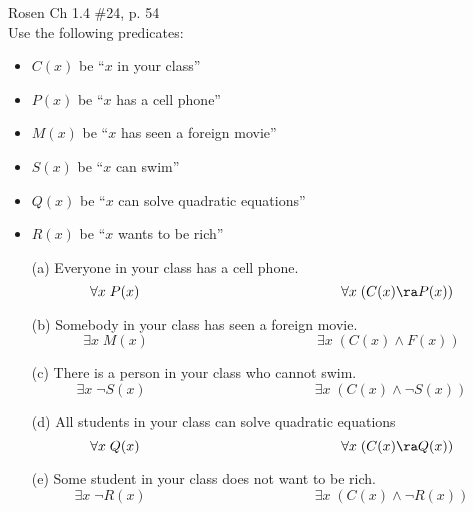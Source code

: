 \begin{questions}
 Rosen Ch 1.4 \#24, p. 54 \\
Use the following predicates:
\begin{itemize}
  \item $C(x)$ be ``$x$ in your class''
  \item $P(x)$ be ``$x$ has a cell phone''
  \item $M(x)$ be ``$x$ has seen a foreign movie''
  \item $S(x)$ be ``$x$ can swim''
  \item $Q(x)$ be ``$x$ can solve quadratic equations''
  \item $R(x)$ be ``$x$ wants to be rich''
\end{itemize}
  \begin{solution}
    \begin{itemize}[itemsep=0pt,parsep=0pt,topsep=0pt,partopsep=0pt]
        \item[(a)] Everyone in your class has a cell phone.
        $$ \forall x\; P(x) \hspace{2in} \forall x\; (C(x) \ra P(x))$$
       \item[(b)] Somebody in your class has seen a foreign movie.
       $$ \exists x\; M(x) \hspace{2in} \exists x\; (C(x) \wedge F(x))$$
       \item[(c)] There is a person in your class who cannot swim.
       $$ \exists x\; \neg S(x) \hspace{2in} \exists x\; (C(x) \wedge \neg S(x))$$
        \item[(d)] All students in your class can solve quadratic equations
        $$ \forall x\; Q(x) \hspace{2in} \forall x\; (C(x) \ra Q(x))$$
        \item[(e)] Some student in your class does not want to be rich.
        $$ \exists x\; \neg R(x) \hspace{2in} \exists x\; (C(x) \wedge \neg R(x))$$
    \end{itemize}

  \end{solution}



\end{questions}
